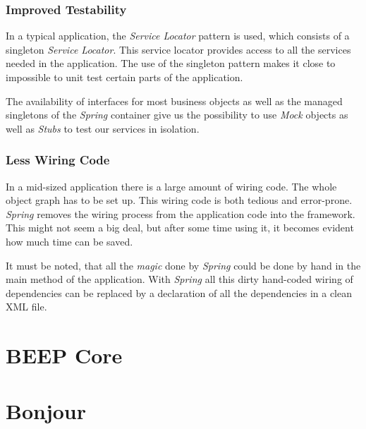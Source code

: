 \subsubsection{Improved Testability}
In a typical application, the \emph{Service Locator} pattern is used, which
consists of a singleton \emph{Service Locator}. This service locator provides
access to all the services needed in the application. The use of the singleton
pattern makes it close to impossible to unit test certain parts of the
application.

The availability of interfaces for most business objects as well as the
managed singletons of the \emph{Spring} container give us the possibility
to use \emph{Mock} objects as well as \emph{Stubs} to test our services
in isolation.

\subsubsection{Less Wiring Code}
In a mid-sized application there is a large amount of wiring code. The whole
object graph has to be set up. This wiring code is both tedious and
error-prone. \emph{Spring} removes the wiring process from the application
code into the framework. This might not seem a big deal, but after some time
using it, it becomes evident how much time can be saved.

It must be noted, that all the \emph{magic} done by \emph{Spring} could be
done by hand in the main method of the application. With \emph{Spring} all
this dirty hand-coded wiring of dependencies can be replaced by a 
declaration of all the dependencies in a clean XML file.


\section{BEEP Core}


\section{Bonjour}


